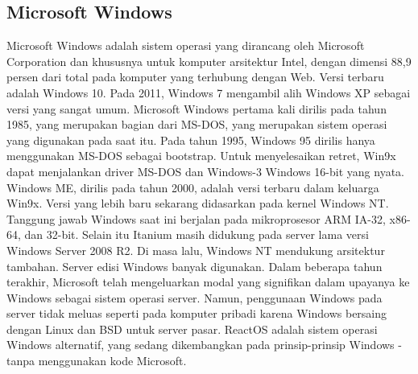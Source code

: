 \subsection{Microsoft Windows}
	\begin{enumerate}
		Microsoft Windows adalah sistem operasi yang dirancang oleh Microsoft Corporation dan khususnya untuk komputer arsitektur Intel, dengan dimensi 88,9 persen dari total pada komputer yang terhubung dengan Web. Versi terbaru adalah Windows 10.
		Pada 2011, Windows 7 mengambil alih Windows XP sebagai versi yang sangat umum. Microsoft Windows pertama kali dirilis pada tahun 1985, yang merupakan bagian dari MS-DOS, yang merupakan sistem operasi yang digunakan pada saat itu. Pada tahun 1995, Windows 95 dirilis hanya menggunakan MS-DOS sebagai bootstrap. Untuk menyelesaikan retret, Win9x dapat menjalankan driver MS-DOS dan Windows-3 Windows 16-bit yang nyata. Windows ME, dirilis pada tahun 2000, adalah versi terbaru dalam keluarga Win9x. Versi yang lebih baru sekarang didasarkan pada kernel Windows NT. Tanggung jawab Windows saat ini berjalan pada mikroprosesor ARM IA-32, x86-64, dan 32-bit. Selain itu Itanium masih didukung pada server lama versi Windows Server 2008 R2. Di masa lalu, Windows NT mendukung arsitektur tambahan. Server edisi Windows banyak digunakan. Dalam beberapa tahun terakhir, Microsoft telah mengeluarkan modal yang signifikan dalam upayanya ke Windows sebagai sistem operasi server. Namun, penggunaan Windows pada server tidak meluas seperti pada komputer pribadi karena Windows bersaing dengan Linux dan BSD untuk server pasar. ReactOS adalah sistem operasi Windows alternatif, yang sedang dikembangkan pada prinsip-prinsip Windows - tanpa menggunakan kode Microsoft.
	\end{enumerate}
	
	
\cite{silberschatz2014operating}
\cite{hoare1974monitors}
\cite{bach1986design}
\cite{love2005linux}
\cite{kukreja2006rui}
\cite{mckeown2009software}
\cite{russinovich2005microsoft}
\cite{van1994treecon}
\cite{mckusick1985performance}
\cite{higgins1988clustal}